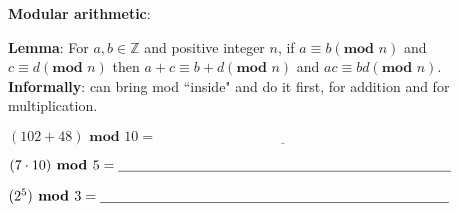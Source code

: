 
{\bf Modular arithmetic}: 

{\bf Lemma}: For $a, b \in \mathbb{Z}$ 
and positive integer $n$, if $a \equiv b (\textbf{mod } n)$ and $c \equiv d (\textbf{mod } n)$ 
then $a+c \equiv b+d (\textbf{mod } n)$ and $ac \equiv bd (\textbf{mod } n)$.
{\bf Informally}: can bring mod ``inside" and do it first, for addition and for multiplication.


$(102 + 48) \textbf{ mod } 10 = \underline{\phantom{\hspace{3in}}} $ 

$(7 \cdot 10) \textbf{ mod } 5 = \underline{\phantom{\hspace{3.3in}}} $ 

$(2^5) \textbf{ mod } 3 =  \underline{\phantom{\hspace{3.45in}}} $ 

\vfill

